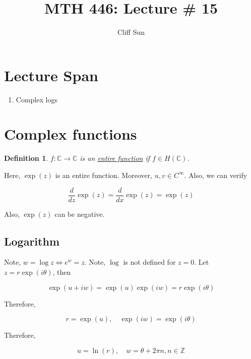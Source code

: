 \documentclass{article}
\title{MTH 446: Lecture \# 15}
\author{Cliff Sun}
\newtheorem{definition}[theorem]{Definition}
\newtheorem{one minute paper}[theorem]{One Minute Paper}
\begin{document}
\maketitle

\section*{Lecture Span}
\begin{enumerate}
    \item Complex logs
\end{enumerate}

\section*{Complex functions}

\begin{definition}
    $f: \mathbb{C} \to \mathbb{C}$ is an \underline{entire function} if $f \in H(\mathbb{C})$. 
\end{definition}

Here, $\exp(z)$ is an entire function. Moreover, $u,v \in C^{\infty}$. Also, we can verify 

\begin{equation}
    \frac{d}{dz}\exp(z) = \frac{d}{dx}\exp(z) = \exp(z)
\end{equation}

Also, $\exp(z)$ can be negative. 

\subsection*{Logarithm}

Note, $w = \log z \iff e^{w} = z$. Note, $\log$ is not defined for $z=0$. Let $z = r\exp(i\theta)$, then 

\begin{equation}
    \exp(u + iw) = \exp(u)\exp(iw) = r\exp(i\theta)
\end{equation}

Therefore, 

\begin{equation}
    r = \exp(u), \quad \exp(iw) = \exp(i\theta)
\end{equation}

Therefore, 

\begin{equation}
    u = \ln(r), \quad w = \theta + 2\pi n, n \in \mathbb{Z}
\end{equation}
\end{document}
